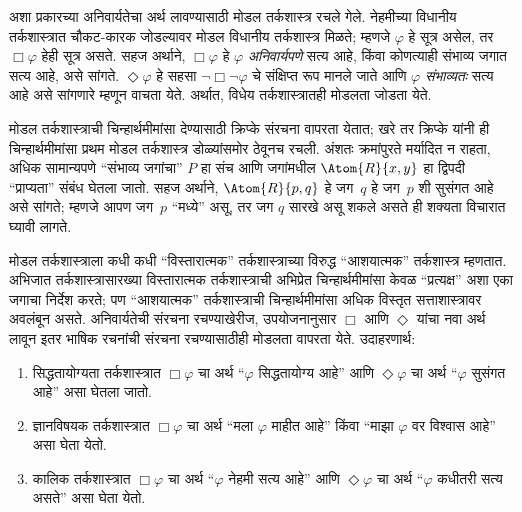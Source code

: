 अशा प्रकारच्या अनिवार्यतेचा अर्थ लावण्यासाठी मोडल तर्कशास्त्र रचले गेले.
नेहमीच्या विधानीय तर्कशास्त्रात चौकट-कारक जोडल्यावर मोडल विधानीय
तर्कशास्त्र मिळते; म्हणजे $\varphi$ हे सूत्र असेल, तर $\Box \varphi$ हेही
सूत्र असते. सहज अर्थाने, $\Box \varphi$ हे $\varphi$ \emph{अनिवार्यपणे} सत्य
आहे, किंवा कोणत्याही संभाव्य जगात सत्य आहे, असे सांगते. $\Diamond \varphi$ हे
सहसा $\lnot \Box \lnot \varphi$ चे संक्षिप्त रूप मानले जाते आणि $\varphi$
\emph{संभाव्यतः} सत्य आहे असे सांगणारे म्हणून वाचता येते. अर्थात, विधेय
तर्कशास्त्रातही मोडलता जोडता येते.

मोडल तर्कशास्त्राची चिन्हार्थमीमांसा देण्यासाठी क्रिप्के संरचना वापरता
येतात; खरे तर क्रिप्के यांनी ही चिन्हार्थमीमांसा प्रथम मोडल तर्कशास्त्र
डोळ्यांसमोर ठेवूनच रचली. अंशतः क्रमांपुरते मर्यादित न राहता, अधिक सामान्यपणे
“संभाव्य जगांचा” $P$ हा संच आणि जगांमधील $\Atom{R}{x,y}$ हा द्विपदी
“प्राप्यता” संबंध घेतला जातो. सहज अर्थाने, $\Atom{R}{p,q}$ हे जग~$q$ हे
जग~$p$ शी सुसंगत आहे असे सांगते; म्हणजे आपण जग~$p$ “मध्ये” असू, तर जग
$q$ सारखे असू शकले असते ही शक्यता विचारात घ्यावी लागते.

मोडल तर्कशास्त्राला कधी कधी “विस्तारात्मक” तर्कशास्त्राच्या विरुद्ध
“आशयात्मक” तर्कशास्त्र म्हणतात. अभिजात तर्कशास्त्रासारख्या विस्तारात्मक
तर्कशास्त्राची अभिप्रेत चिन्हार्थमीमांसा केवळ “प्रत्यक्ष” अशा एका जगाचा
निर्देश करते; पण “आशयात्मक” तर्कशास्त्राची चिन्हार्थमीमांसा अधिक विस्तृत
सत्ताशास्त्रावर अवलंबून असते. अनिवार्यतेची संरचना रचण्याखेरीज,
उपयोजनानुसार $\Box$ आणि $\Diamond$ यांचा नवा अर्थ लावून इतर भाषिक रचनांची
संरचना रचण्यासाठीही मोडलता वापरता येते. उदाहरणार्थ:
\begin{enumerate}
\item सिद्धतायोग्यता तर्कशास्त्रात $\Box \varphi$ चा अर्थ “$\varphi$ सिद्धतायोग्य
  आहे” आणि $\Diamond \varphi$ चा अर्थ “$\varphi$ सुसंगत आहे” असा घेतला जातो.
\item ज्ञानविषयक तर्कशास्त्रात $\Box \varphi$ चा अर्थ “मला $\varphi$ माहीत आहे” किंवा
  “माझा $\varphi$ वर विश्वास आहे” असा घेता येतो.
\item कालिक तर्कशास्त्रात $\Box \varphi$ चा अर्थ “$\varphi$ नेहमी सत्य आहे” आणि
  $\Diamond \varphi$ चा अर्थ “$\varphi$ कधीतरी सत्य असते” असा घेता येतो.
\end{enumerate}

